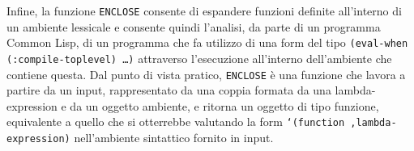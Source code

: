 Infine, la funzione \texttt{ENCLOSE} consente di espandere funzioni definite
all’interno di un ambiente lessicale e consente quindi l’analisi, da parte di un
programma Common Lisp, di un programma che fa utilizzo di una form del tipo
\texttt{(eval-when (:compile-toplevel) …)} attraverso l’esecuzione all’interno
dell’ambiente che contiene questa. Dal punto di vista pratico, \texttt{ENCLOSE}
è una funzione che lavora a partire da un input, rappresentato da una coppia
formata da una lambda-expression e da un oggetto ambiente, e ritorna un oggetto
di tipo funzione, equivalente a quello che si otterrebbe valutando la form
\texttt{`(function ,lambda-expression)} nell'ambiente sintattico fornito in
input.
